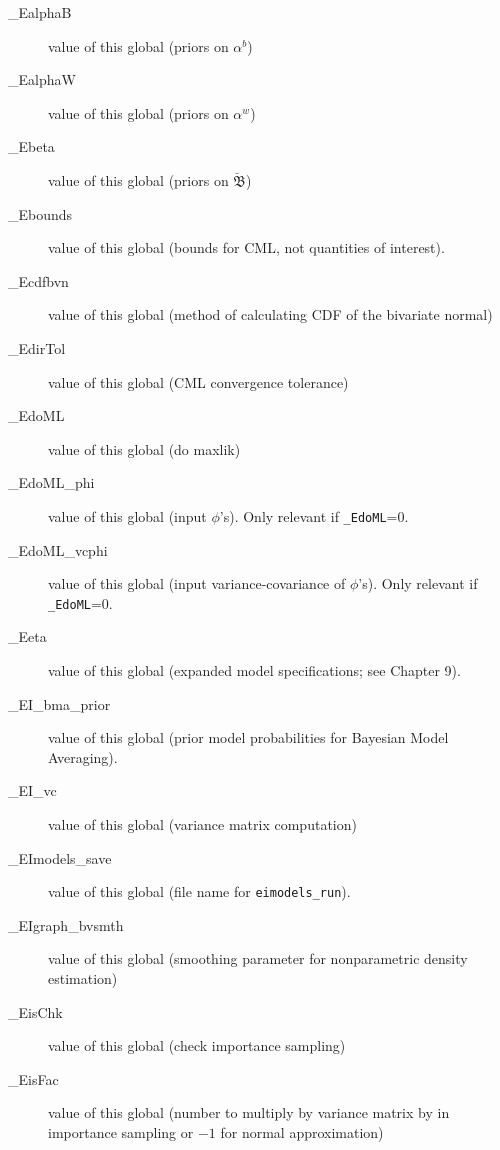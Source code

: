 \documentclass[11pt,titlepage]{article}
\newcommand{\bbetau}{\breve{\mathfrak B}}
\begin{document}
\begin{description}
\item[\_EalphaB] value of this global (priors on $\alpha^b$)

\item[\_EalphaW] value of this global (priors on $\alpha^w$)

\item[\_Ebeta] value of this global (priors on $\bbetau$)

\item[\_Ebounds] value of this global (bounds for CML, not quantities
  of interest).

\item[\_Ecdfbvn] value of this global (method of calculating CDF of
  the bivariate normal)

\item[\_EdirTol] value of this global (CML convergence tolerance)

\item[\_EdoML] value of this global (do maxlik)

\item[\_EdoML\_phi] value of this global (input $\phi$'s).  Only
  relevant if \texttt{\_EdoML}=0.

\item[\_EdoML\_vcphi] value of this global (input variance-covariance
  of $\phi$'s).  Only relevant if \texttt{\_EdoML}=0.

\item[\_Eeta] value of this global (expanded model specifications; see
  Chapter 9).

\item[\_EI\_bma\_prior] value of this global (prior model
  probabilities for Bayesian Model Averaging).

\item[\_EI\_vc] value of this global (variance matrix computation)

\item[\_EImodels\_save] value of this global (file name for
  \texttt{eimodels\_run}).

\item[\_EIgraph\_bvsmth] value of this global (smoothing parameter for
  nonparametric density estimation)

\item[\_EisChk] value of this global (check importance sampling)

\item[\_EisFac] value of this global (number to multiply by variance
  matrix by in importance sampling or $-1$ for normal approximation)


\end{description}
\end{document}
